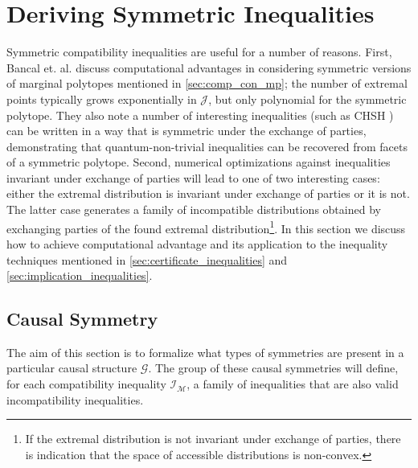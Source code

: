 \documentclass[aps, 10pt, english, twoside, pra, nofootinbib, longbibliography]{revtex4-1}
\theoremstyle{plain}
\theoremstyle{definition}
\theoremstyle{remark}
\newcommand{\graph}{\mathcal{G}}
\newcommand{\mscenario}{\mathcal{M}}
\newcommand{\jointvar}{\mathcal{J}}
\begin{document}
    \section{Deriving Symmetric Inequalities}
    \label{sec:symmetry}
    Symmetric compatibility inequalities are useful for a number of reasons. First, Bancal et. al. \cite{Bancal_2010} discuss computational advantages in considering symmetric versions of marginal polytopes mentioned in \cref{sec:comp_con_mp}; the number of extremal points typically grows exponentially in $\jointvar$, but only polynomial for the symmetric polytope. They also note a number of interesting inequalities (such as CHSH \cite{CHSH_Original}) can be written in a way that is symmetric under the exchange of parties, demonstrating that quantum-non-trivial inequalities can be recovered from facets of a symmetric polytope. Second, numerical optimizations against inequalities invariant under exchange of parties will lead to one of two interesting cases: either the extremal distribution is invariant under exchange of parties or it is not. The latter case generates a family of incompatible distributions obtained by exchanging parties of the found extremal distribution\footnote{If the extremal distribution is not invariant under exchange of parties, there is indication that the space of accessible distributions is non-convex.}. In this section we discuss how to achieve computational advantage and its application to the inequality techniques mentioned in \cref{sec:certificate_inequalities} and \cref{sec:implication_inequalities}.
    \subsection{Causal Symmetry}
    The aim of this section is to formalize what types of symmetries are present in a particular causal structure $\graph$. The group of these causal symmetries will define, for each compatibility inequality $\mathcal{I}_{\mscenario}$, a family of inequalities that are also valid incompatibility inequalities.
\end{document}
